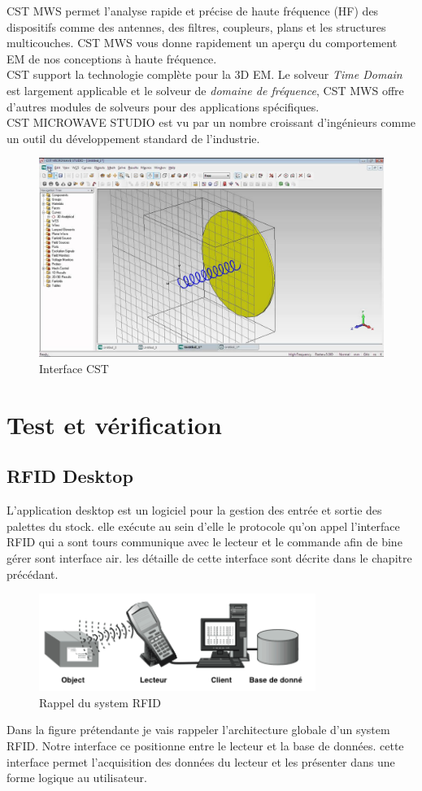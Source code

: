 \documentclass[11pt, a4paper, twoside]{book}
\begin{document}
CST MWS permet l'analyse rapide et précise de haute fréquence (HF) des dispositifs comme des antennes, des filtres, coupleurs, plans et les structures multicouches.  CST MWS vous donne rapidement un aperçu du comportement EM de nos conceptions à haute fréquence.\\

CST support la technologie complète pour la 3D EM. Le solveur \emph{Time Domain} est largement applicable et le solveur de \emph{domaine de fréquence}, CST MWS offre d'autres modules de solveurs pour des applications spécifiques. \\

CST MICROWAVE STUDIO est vu par un nombre croissant d'ingénieurs comme un outil du développement standard de l'industrie.
\begin{figure}[H]
\centering
\includegraphics[width=\textwidth]{cst}
\caption{Interface CST}
\end{figure}
\section{Test	 et vérification	}
\subsection{RFID Desktop}
L'application desktop  est un logiciel pour la gestion des entrée et sortie des palettes du stock. elle exécute au sein d'elle le protocole qu'on appel l'interface RFID qui a sont tours communique avec le lecteur et le commande  afin de bine gérer sont interface air. les détaille de cette interface sont décrite dans le chapitre précédant. 
\begin{figure}[H]
\centering
\includegraphics[width=9cm]{systemx}
\caption{Rappel du system RFID}
\end{figure}
Dans la figure prétendante je vais rappeler l'architecture globale d'un system RFID. Notre interface ce positionne entre le lecteur et la base de données. cette interface permet l'acquisition des données du lecteur et les présenter dans une forme logique au utilisateur.
\end{document}
